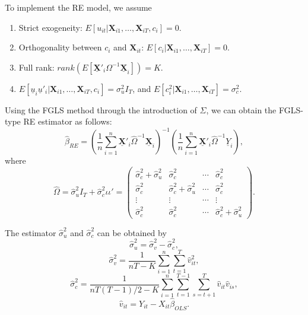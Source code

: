 \documentclass[
  12pt,
]{article}
\providecommand{\tightlist}{%
  \setlength{\itemsep}{0pt}\setlength{\parskip}{0pt}}
\begin{document}
To implement the RE model, we assume

\begin{enumerate}
\def\labelenumi{\arabic{enumi}.}
\tightlist
\item
  Strict exogeneity: \(E[u_{it} | \mathbf{X}_{i1}, \ldots, \mathbf{X}_{iT}, c_i] = 0\).
\item
  Orthogonality between \(c_i\) and \(\mathbf{X}_{it}\): \(E[c_i | \mathbf{X}_{i1}, \ldots, \mathbf{X}_{iT}] = 0\).
\item
  Full rank: \(rank(E[\underline{\mathbf{X}}'_i \Omega^{-1} \underline{\mathbf{X}}_i]) = K\).
\item
  \(E[\underline{u}_i\underline{u}'_i | \mathbf{X}_{i1}, \ldots, \mathbf{X}_{iT}, c_i] = \sigma_u^2 I_T\), and \(E[c_i^2 | \mathbf{X}_{i1}, \ldots, \mathbf{X}_{iT}] = \sigma_c^2\).
\end{enumerate}

Using the FGLS method through the introduction of \(\Sigma\),
we can obtain the FGLS-type RE estimator as follows:
\[
  \hat{\beta}_{RE} = 
  \left( \frac{1}{n} \sum_{i=1}^n \underline{\mathbf{X}}'_i \hat{\Omega}^{-1} \underline{\mathbf{X}}_i \right)^{-1}
  \left( \frac{1}{n} \sum_{i=1}^n \underline{\mathbf{X}}'_i \hat{\Omega}^{-1} \underline{Y}_i \right),
\]
where
\[
  \hat{\Omega} = \hat{\sigma}_u^2 I_T + \hat{\sigma}_c^2 \iota \iota' =
  \begin{pmatrix}
    \hat{\sigma}_c^2 + \hat{\sigma}_u^2 & \hat{\sigma}_c^2 & \cdots & \hat{\sigma}_c^2 \\
    \hat{\sigma}_c^2 & \hat{\sigma}_c^2 + \hat{\sigma}_u^2 & \cdots & \hat{\sigma}_c^2 \\
    \vdots & \vdots & \cdots & \vdots \\
    \hat{\sigma}_c^2 & \hat{\sigma}_c^2 & \cdots & \hat{\sigma}_c^2 + \hat{\sigma}_u^2
  \end{pmatrix}.
\]

The estimator \(\hat{\sigma}_u^2\) and \(\hat{\sigma}_c^2\) can be obtained by
\[
  \hat{\sigma}_u^2 = \hat{\sigma}_v^2 - \hat{\sigma}_c^2,
\]
\[
  \hat{\sigma}_v^2 = \frac{1}{nT - K} \sum_{i=1}^n \sum_{t=1}^T \hat{v}_{it}^2,
\]
\[
  \hat{\sigma}_c^2 = 
  \frac{1}{nT(T-1)/2 - K} \sum_{i=1}^n \sum_{t=1}^{T-1} \sum_{s=t+1}^T \hat{v}_{it} \hat{v}_{is},
\]
\[
  \hat{v}_{it} = Y_{it} - X_{it} \hat{\beta}_{OLS}.
\]
\end{document}
